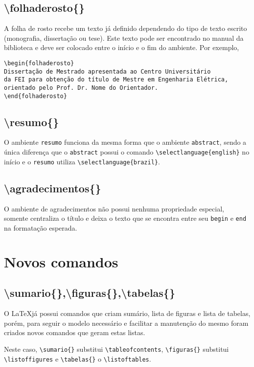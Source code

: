     \subsection{\textbackslash folhaderosto\{\}}
    A folha de rosto recebe um texto já definido dependendo do tipo de texto escrito (monografia, dissertação ou tese). Este texto pode ser encontrado no manual da biblioteca e deve ser colocado entre o início e o fim do ambiente. Por exemplo,
    \begin{verbatim}
\begin{folhaderosto}
Dissertação de Mestrado apresentada ao Centro Universitário
da FEI para obtenção do título de Mestre em Engenharia Elétrica, 
orientado pelo Prof. Dr. Nome do Orientador. 
\end{folhaderosto}
    \end{verbatim}

    \subsection{\textbackslash resumo\{\}}
    O ambiente \verb+resumo+ funciona da mesma forma que o ambiente \verb+abstract+, sendo a única diferença que o \verb+abstract+ possui o comando \verb+\selectlanguage{english}+ no início e o \verb+resumo+ utiliza \verb+\selectlanguage{brazil}+.

    \subsection{\textbackslash agradecimentos\{\}}
    O ambiente de agradecimentos não possui nenhuma propriedade especial, somente centraliza o título e deixa o texto que se encontra entre seu \verb+begin+ e \verb+end+ na formatação esperada.

\section{Novos comandos}
    
    \subsection{\textbackslash sumario\{\},\textbackslash figuras\{\},\textbackslash tabelas\{\}}
    O \LaTeX já possui comandos que criam sumário, lista de figuras e lista de tabelas, porém, para seguir o modelo necessário e facilitar a manutenção do mesmo foram criados novos comandos que geram estas listas.

    Neste caso, \verb+\sumario{}+ substitui \verb+\tableofcontents+, \verb+\figuras{}+ substitui \verb+\listoffigures+ e \verb+\tabelas{}+ o \verb+\listoftables+.

